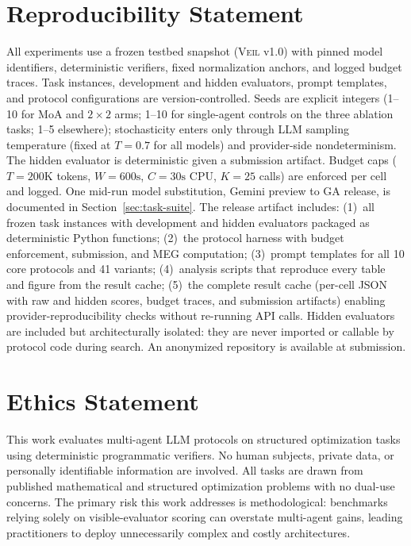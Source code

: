 \documentclass{article}
\begin{document}
\section*{Reproducibility Statement}
All experiments use a frozen testbed snapshot (\textsc{Veil} v1.0) with pinned model identifiers, deterministic verifiers, fixed normalization anchors, and logged budget traces. Task instances, development and hidden evaluators, prompt templates, and protocol configurations are version-controlled. Seeds are explicit integers (1--10 for MoA and $2{\times}2$ arms; 1--10 for single-agent controls on the three ablation tasks; 1--5 elsewhere); stochasticity enters only through LLM sampling temperature (fixed at $T{=}0.7$ for all models) and provider-side nondeterminism. The hidden evaluator is deterministic given a submission artifact. Budget caps ($T{=}200\text{K}$ tokens, $W{=}600\text{s}$, $C{=}30\text{s}$ CPU, $K{=}25$ calls) are enforced per cell and logged. One mid-run model substitution, Gemini preview to GA release, is documented in Section~\ref{sec:task-suite}. The release artifact includes: (1)~all frozen task instances with development and hidden evaluators packaged as deterministic Python functions; (2)~the protocol harness with budget enforcement, submission, and MEG computation; (3)~prompt templates for all 10 core protocols and 41 variants; (4)~analysis scripts that reproduce every table and figure from the result cache; (5)~the complete result cache (per-cell JSON with raw and hidden scores, budget traces, and submission artifacts) enabling provider-reproducibility checks without re-running API calls. Hidden evaluators are included but architecturally isolated: they are never imported or callable by protocol code during search. An anonymized repository is available at submission.

\section*{Ethics Statement}
This work evaluates multi-agent LLM protocols on structured optimization tasks using deterministic programmatic verifiers. No human subjects, private data, or personally identifiable information are involved. All tasks are drawn from published mathematical and structured optimization problems with no dual-use concerns. The primary risk this work addresses is methodological: benchmarks relying solely on visible-evaluator scoring can overstate multi-agent gains, leading practitioners to deploy unnecessarily complex and costly architectures.
\end{document}

